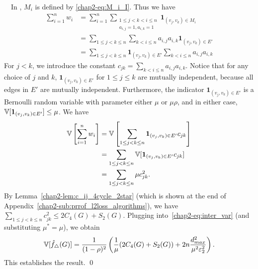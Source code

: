 {%
\smallskip
{}~~In \AlgOne{}, $M_i$ is defined by \eqref{chap2-eq:M_i_I}. Thus we have
\begin{align*}
  \sum_{i=1}^n w_i &= \sum_{i=1}^n \sum_{\substack{1 \leq j < k < i \leq n \\ a_{i,j} = 1, a_{i,k} = 1}} \textbf{1}_{(v_j, v_k) \in M_i} \\
  &= \sum_{1 \leq j < k \leq n} \sum_{k < i \leq n} a_{i,j} a_{i,k} \textbf{1}_{(v_j, v_k) \in E'} \\
  &= \sum_{1 \leq j < k \leq n} \textbf{1}_{(v_j, v_k) \in E'}\sum_{k < i \leq n} a_{i,j} a_{i,k}
\end{align*}
For $j < k$, we introduce the constant $c_{jk} = \sum_{k < i \leq n} a_{i,j} a_{i,k}$. Notice that
for any choice of $j$ and $k$, $\textbf{1}_{(v_j, v_k) \in E'}$ for $1 \leq j \leq k$ are mutually independent,
because all edges in $E'$ are mutually independent. Furthermore, the indicator
$\textbf{1}_{(v_j, v_k) \in E'}$ is a Bernoulli random variable with parameter
either $\mu$ or $\mu\rho$, and in either case, $\operatorname{\mathbb{V}}[\textbf{1}_{(v_j, v_k) \in
E'}] \leq \mu$. We have
\begin{align*}
  \operatorname{\mathbb{V}}\left[\sum_{i=1}^n w_i\right]
  &= \operatorname{\mathbb{V}}\left[\sum_{1 \leq j < k \leq n} \textbf{1}_{(v_j, v_k) \in E'}c_{jk}\right] \\
  &= \sum_{1 \leq j < k \leq n} \operatorname{\mathbb{V}}[\textbf{1}_{(v_j, v_k) \in E'}c_{jk}] \\
  &= \sum_{1 \leq j < k \leq n} \mu c_{jk}^2.
\end{align*}
By Lemma~\ref{chap2-lem:c_ij_4cycle_2star} (which is shown at the end of Appendix~\ref{chap2-sub:prrof_l2loss_algorithms}), we have $\sum_{1 \leq j < k \leq n} c_{jk}^2 \leq 2 C_4(G) + S_2(G)$.
Plugging into~\eqref{chap2-eq:inter_var} (and substituting $\mu^* = \mu$), we obtain
\begin{align*}
  \operatorname{\mathbb{V}}[\hat{f}_\triangle(G)]
  &= \frac{1}{(1-\rho)^2}\left(\frac{1}{\mu}(2C_4(G) + S_2(G)) +
  2n\frac{d_{max}^2}{\mu^2\varepsilon_2^2}\right). \\
\end{align*}
This establishes the result. \qed

}
